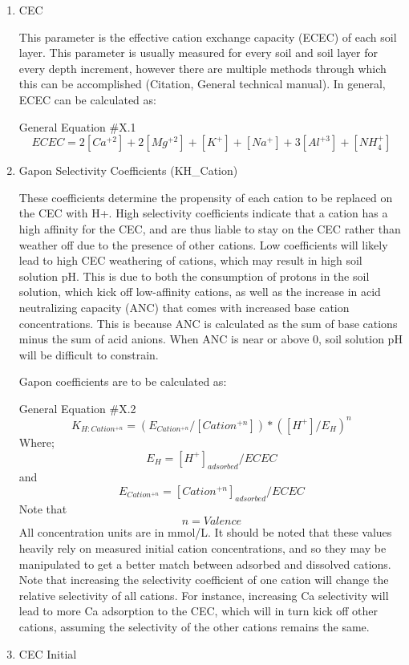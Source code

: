 \documentclass[
]{article}
\begin{document}
\begin{enumerate}
\def\labelenumi{\arabic{enumi}.}
\item
  CEC

  This parameter is the effective cation exchange capacity (ECEC) of
  each soil layer. This parameter is usually measured for every soil and
  soil layer for every depth increment, however there are multiple
  methods through which this can be accomplished (Citation, General
  technical manual). In general, ECEC can be calculated as:

  General Equation \#X.1 \[
  ECEC= 2[Ca^{+2}]+ 2[Mg^{+2}]+[K^+]+[Na^+]+3[Al^{+3}]+[NH_{4}^{+}]
  \]
\item
  Gapon Selectivity Coefficients (KH\_Cation)

  These coefficients determine the propensity of each cation to be
  replaced on the CEC with H+. High selectivity coefficients indicate
  that a cation has a high affinity for the CEC, and are thus liable to
  stay on the CEC rather than weather off due to the presence of other
  cations. Low coefficients will likely lead to high CEC weathering of
  cations, which may result in high soil solution pH. This is due to
  both the consumption of protons in the soil solution, which kick off
  low-affinity cations, as well as the increase in acid neutralizing
  capacity (ANC) that comes with increased base cation concentrations.
  This is because ANC is calculated as the sum of base cations minus the
  sum of acid anions. When ANC is near or above 0, soil solution pH will
  be difficult to constrain.

  Gapon coefficients are to be calculated as:

  General Equation \#X.2 \[
  K_{H:Cation^{+n}}= (E_{Cation^{+n}}/[Cation^{+n}])*([H^{+}]/E_{H})^{n}
  \] Where; \[
  E_{H}=[H^{+}]_{adsorbed}/ECEC
  \] and \[
  E_{Cation^{+n}}=[Cation^{+n}]_{adsorbed}/ECEC
  \] Note that \[
  n = Valence
  \] All concentration units are in mmol/L. It should be noted that
  these values heavily rely on measured initial cation concentrations,
  and so they may be manipulated to get a better match between adsorbed
  and dissolved cations. Note that increasing the selectivity
  coefficient of one cation will change the relative selectivity of all
  cations. For instance, increasing Ca selectivity will lead to more Ca
  adsorption to the CEC, which will in turn kick off other cations,
  assuming the selectivity of the other cations remains the same.
\item
  CEC Initial


\end{enumerate}
\end{document}
